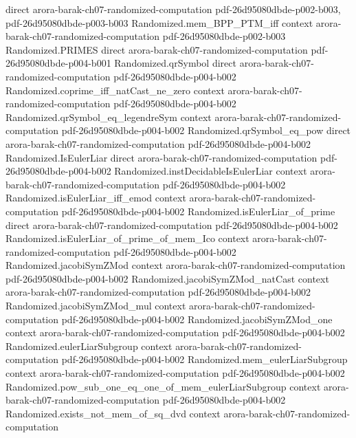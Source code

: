 \begin{theorem}
  {direct}
  {arora-barak-ch07-randomized-computation}
  {pdf-26d95080dbde-p002-b003,
    pdf-26d95080dbde-p003-b003}
\proofstep
  {Randomized.mem_BPP_PTM_iff}
  {context}
  {arora-barak-ch07-randomized-computation}
  {pdf-26d95080dbde-p002-b003}
\proofstep
  {Randomized.PRIMES}
  {direct}
  {arora-barak-ch07-randomized-computation}
  {pdf-26d95080dbde-p004-b001}
\proofstep
  {Randomized.qrSymbol}
  {direct}
  {arora-barak-ch07-randomized-computation}
  {pdf-26d95080dbde-p004-b002}
\proofstep
  {Randomized.coprime_iff_natCast_ne_zero}
  {context}
  {arora-barak-ch07-randomized-computation}
  {pdf-26d95080dbde-p004-b002}
\proofstep
  {Randomized.qrSymbol_eq_legendreSym}
  {context}
  {arora-barak-ch07-randomized-computation}
  {pdf-26d95080dbde-p004-b002}
\proofstep
  {Randomized.qrSymbol_eq_pow}
  {direct}
  {arora-barak-ch07-randomized-computation}
  {pdf-26d95080dbde-p004-b002}
\proofstep
  {Randomized.IsEulerLiar}
  {direct}
  {arora-barak-ch07-randomized-computation}
  {pdf-26d95080dbde-p004-b002}
\proofstep
  {Randomized.instDecidableIsEulerLiar}
  {context}
  {arora-barak-ch07-randomized-computation}
  {pdf-26d95080dbde-p004-b002}
\proofstep
  {Randomized.isEulerLiar_iff_emod}
  {context}
  {arora-barak-ch07-randomized-computation}
  {pdf-26d95080dbde-p004-b002}
\proofstep
  {Randomized.isEulerLiar_of_prime}
  {direct}
  {arora-barak-ch07-randomized-computation}
  {pdf-26d95080dbde-p004-b002}
\proofstep
  {Randomized.isEulerLiar_of_prime_of_mem_Ico}
  {context}
  {arora-barak-ch07-randomized-computation}
  {pdf-26d95080dbde-p004-b002}
\proofstep
  {Randomized.jacobiSymZMod}
  {context}
  {arora-barak-ch07-randomized-computation}
  {pdf-26d95080dbde-p004-b002}
\proofstep
  {Randomized.jacobiSymZMod_natCast}
  {context}
  {arora-barak-ch07-randomized-computation}
  {pdf-26d95080dbde-p004-b002}
\proofstep
  {Randomized.jacobiSymZMod_mul}
  {context}
  {arora-barak-ch07-randomized-computation}
  {pdf-26d95080dbde-p004-b002}
\proofstep
  {Randomized.jacobiSymZMod_one}
  {context}
  {arora-barak-ch07-randomized-computation}
  {pdf-26d95080dbde-p004-b002}
\proofstep
  {Randomized.eulerLiarSubgroup}
  {context}
  {arora-barak-ch07-randomized-computation}
  {pdf-26d95080dbde-p004-b002}
\proofstep
  {Randomized.mem_eulerLiarSubgroup}
  {context}
  {arora-barak-ch07-randomized-computation}
  {pdf-26d95080dbde-p004-b002}
\proofstep
  {Randomized.pow_sub_one_eq_one_of_mem_eulerLiarSubgroup}
  {context}
  {arora-barak-ch07-randomized-computation}
  {pdf-26d95080dbde-p004-b002}
\proofstep
  {Randomized.exists_not_mem_of_sq_dvd}
  {context}
  {arora-barak-ch07-randomized-computation}

\end{theorem}
